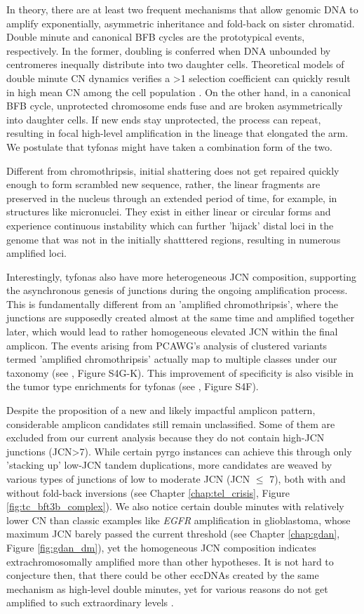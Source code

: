 \documentclass[phd,tocprelim]{cornell}
\begin{document}
In theory, there are at least two frequent mechanisms that allow genomic DNA to amplify exponentially, asymmetric inheritance and fold-back on sister chromatid. Double minute and canonical BFB cycles are the prototypical events, respectively. In the former, doubling is conferred when DNA unbounded by centromeres inequally distribute into two daughter cells. Theoretical models of double minute CN dynamics verifies a >1 selection coefficient can quickly result in high mean CN among the cell population \cite{Lange2021-if}. On the other hand, in a canonical BFB cycle, unprotected chromosome ends fuse and are broken asymmetrically into daughter cells. If new ends stay unprotected, the process can repeat, resulting in focal high-level amplification in the lineage that elongated the arm. We postulate that tyfonas might have taken a combination form of the two. 

Different from chromothripsis, initial shattering does not get repaired quickly enough to form scrambled new sequence, rather, the linear fragments are preserved in the nucleus through an extended period of time, for example, in structures like micronuclei. They exist in either linear or circular forms and experience continuous instability which can further 'hijack' distal loci in the genome that was not in the initially shatttered regions, resulting in numerous amplified loci.

Interestingly, tyfonas also have more heterogeneous JCN composition, supporting the asynchronous genesis of junctions during the ongoing amplification process. This is fundamentally different from an 'amplified chromothripsis', where the junctions are supposedly created almost at the same time and amplified together later, which would lead to rather homogeneous elevated JCN within the final amplicon. The events arising from PCAWG's analysis of clustered variants termed 'amplified chromothripsis' \cite{pcawg_marker2020-yi} actually map to multiple classes under our taxonomy (see \cite{Hadi2020-um}, Figure S4G-K). This improvement of specificity is also visible in the tumor type enrichments for tyfonas (see \cite{Hadi2020-um}, Figure S4F).

Despite the proposition of a new and likely impactful amplicon pattern, considerable amplicon candidates still remain unclassified. Some of them are excluded from our current analysis because they do not contain high-JCN junctions (JCN>7). While certain pyrgo instances can achieve this through only 'stacking up' low-JCN tandem duplications, more candidates are weaved by various types of junctions of low to moderate JCN (JCN $\le$ 7), both with and without fold-back inversions (see Chapter \ref{chap:tel_crisis}, Figure \ref{fig:tc_bft3b_complex}). We also notice certain double minutes with relatively lower CN than classic examples like \textit{EGFR} amplification in glioblastoma, whose maximum JCN barely passed the current threshold (see Chapter \ref{chap:gdan}, Figure \ref{fig:gdan_dm}), yet the homogeneous JCN composition indicates extrachromosomally amplified more than other hypotheses. It is not hard to conjecture then, that there could be other eccDNAs created by the same mechanism as high-level double minutes, yet for various reasons do not get amplified to such extraordinary levels \cite{Lange2021-if}.
\end{document}
